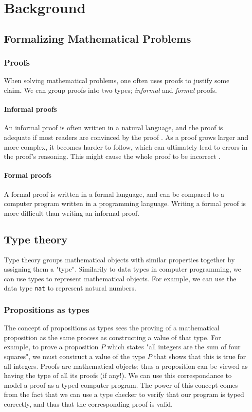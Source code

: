 \chapter{Background}

\section{Formalizing Mathematical Problems}

\subsection{Proofs}

When solving mathematical problems, one often uses proofs
to justify some claim. We can group proofs into two types; \textit{informal} and \textit{formal} proofs.

\subsubsection{Informal proofs}
An informal proof is often written in a natural language, and the proof is adequate if most
readers are convinced by the proof \cite{bpierce}.
As a proof grows larger and more complex, it becomes harder to follow, which can
ultimately lead to errors in the proof's reasoning. This might cause the whole proof
to be incorrect \cite{rkhamsi}.

\subsubsection{Formal proofs}
A formal proof is written in a formal language, and can be compared to a computer program
written in a programming language. Writing a formal proof is more difficult than writing an informal proof.

\section{Type theory}

Type theory groups mathematical objects with similar properties together by assigning them a "type".
Similarily to data types in computer programming, we can use types to represent mathematical
objects. For example, we can use the data type \texttt{nat} to represent natural numbers.

\subsection{Propositions as types}
The concept of propositions as types sees the proving of a mathematical proposition
as the same process as constructing a value of that type.
For example, to prove a proposition $P$ which states "all integers are the sum of four squares",
we must construct a value of the type $P$ that shows that this is true for all integers.
Proofs are mathematical objects; thus a proposition can be viewed as having the type of all its proofs (if any!).
We can use this correspondance to model a proof as a typed computer program.
The power of this concept comes from the fact that we can use a type checker to verify that
our program is typed correctly, and thus that the corresponding proof is valid.


